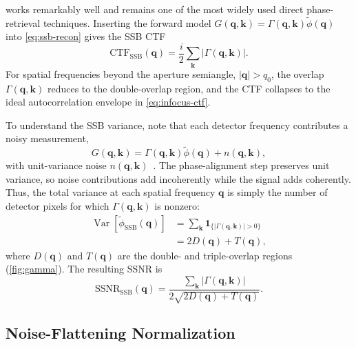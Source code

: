 \documentclass[pdflatex,sn-aps,iicol]{sn-jnl}%
\begin{document}
 works remarkably well and remains one of the most widely used direct phase-retrieval techniques.
Inserting the forward model $G(\boldsymbol{q},\boldsymbol{k})=\Gamma(\boldsymbol{q},\boldsymbol{k})\tilde{\phi}(\boldsymbol{q})$ into \cref{eq:ssb-recon} gives the SSB CTF~\cite{Yang_2016}
\begin{equation}
  \mathrm{CTF}_{\text{SSB}}(\boldsymbol{q}) = \frac{i}{2} \sum_{\boldsymbol{k}} \lvert \Gamma(\boldsymbol{q},\boldsymbol{k}) \rvert.
  \label{eq:ctf-ssb}
\end{equation}
For spatial frequencies beyond the aperture semiangle, $\lvert \boldsymbol{q} \rvert > q_0$, the overlap $\Gamma(\boldsymbol{q},\boldsymbol{k})$ reduces to the double-overlap region, and the CTF collapses to the ideal autocorrelation envelope in \cref{eq:infocus-ctf}.

To understand the SSB variance, note that each detector frequency contributes a noisy measurement,
\begin{equation}
  G(\boldsymbol{q},\boldsymbol{k}) = \Gamma(\boldsymbol{q},\boldsymbol{k})\tilde{\phi}(\boldsymbol{q}) + n(\boldsymbol{q},\boldsymbol{k}),
  \label{eq:noise-model}
\end{equation}
with unit-variance noise $n(\boldsymbol{q},\boldsymbol{k})$~\cite{Bennemann_2025}.
The phase-alignment step preserves unit variance, so noise contributions add incoherently while the signal adds coherently.
Thus, the total variance at each spatial frequency $\boldsymbol{q}$ is simply the number of detector pixels for which $\Gamma(\boldsymbol{q},\boldsymbol{k})$ is nonzero:
\begin{align}
  \operatorname{Var}\!\left[\tilde{\phi}_{\text{SSB}}(\boldsymbol{q})\right] &= \sum_{\boldsymbol{k}} \mathbf{1}_{\{\lvert \Gamma(\boldsymbol{q},\boldsymbol{k}) \rvert > 0\}} \nonumber\\
  &= 2 D(\boldsymbol{q})+T(\boldsymbol{q}), 
  \label{eq:var-ssb}
\end{align}
where $D(\boldsymbol{q})$ and $T(\boldsymbol{q})$ are the double- and triple-overlap regions (\cref{fig:gamma}).
The resulting SSNR is~\cite{Bennemann_2025,Varnavides_2025_ssnr}
\begin{equation}
  \mathrm{SSNR}_{\text{SSB}}(\boldsymbol{q}) = \frac{\sum_{\boldsymbol{k}}\lvert \Gamma(\boldsymbol{q},\boldsymbol{k}) \rvert} {2\sqrt{2D(\boldsymbol{q})+T(\boldsymbol{q})}} .
  \label{eq:ssb-ssnr}
\end{equation}

\subsection{Noise-Flattening Normalization}
\label{sec:obf}
\end{document}
